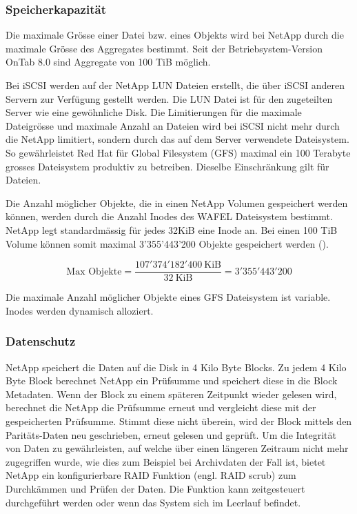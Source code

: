 \subsubsection*{Speicherkapazität}
Die maximale Grösse einer Datei bzw. eines Objekts wird bei NetApp durch die maximale Grösse des Aggregates bestimmt. Seit der Betriebsystem-Version OnTab 8.0 sind Aggregate von 100 TiB möglich.

Bei iSCSI werden auf der NetApp LUN Dateien erstellt, die über iSCSI anderen Servern zur Verfügung gestellt werden. Die LUN Datei ist für den zugeteilten Server wie eine gewöhnliche Disk. Die Limitierungen für die maximale Dateigrösse und maximale Anzahl an Dateien wird bei iSCSI nicht mehr durch die NetApp limitiert, sondern durch das auf dem Server verwendete Dateisystem. So gewährleistet Red Hat für Global Filesystem (GFS) maximal ein 100 Terabyte grosses Dateisystem produktiv zu betreiben. Dieselbe Einschränkung gilt für Dateien. 

Die Anzahl möglicher Objekte, die in einen NetApp Volumen gespeichert werden können, werden durch die Anzahl Inodes des WAFEL Dateisystem bestimmt. NetApp legt standardmässig für jedes 32KiB eine Inode an. Bei einen 100 TiB Volume können somit maximal 3'355'443'200 Objekte gespeichert werden ().

\begin{equation}
\mbox{Max Objekte} = \frac{107'374'182'400 \mathrm{\ KiB}}{32 \mathrm{\ KiB}}= 3'355'443'200 
\label{eqn:MaxObjekteNetApp}
\end{equation}

Die maximale Anzahl möglicher Objekte eines GFS Dateisystem ist variable. Inodes werden dynamisch alloziert.

\subsubsection*{Datenschutz}
NetApp speichert die Daten auf die Disk in 4 Kilo Byte Blocks. Zu jedem 4 Kilo Byte Block berechnet NetApp ein Prüfsumme und speichert diese in die Block Metadaten. Wenn der Block zu einem späteren Zeitpunkt wieder gelesen wird, berechnet die NetApp die Prüfsumme erneut und vergleicht diese mit der gespeicherten Prüfsumme. Stimmt diese nicht überein, wird der Block mittels den Paritäts-Daten neu geschrieben, erneut gelesen und geprüft. Um die Integrität von Daten zu gewährleisten, auf welche über einen längeren Zeitraum nicht mehr zugegriffen wurde, wie dies zum Beispiel bei Archivdaten der Fall ist, bietet NetApp ein konfigurierbare RAID Funktion (engl. RAID scrub) zum Durchkämmen und Prüfen der Daten. Die Funktion kann zeitgesteuert durchgeführt werden oder wenn das System sich im Leerlauf befindet. \cite{Sundaram2006}

